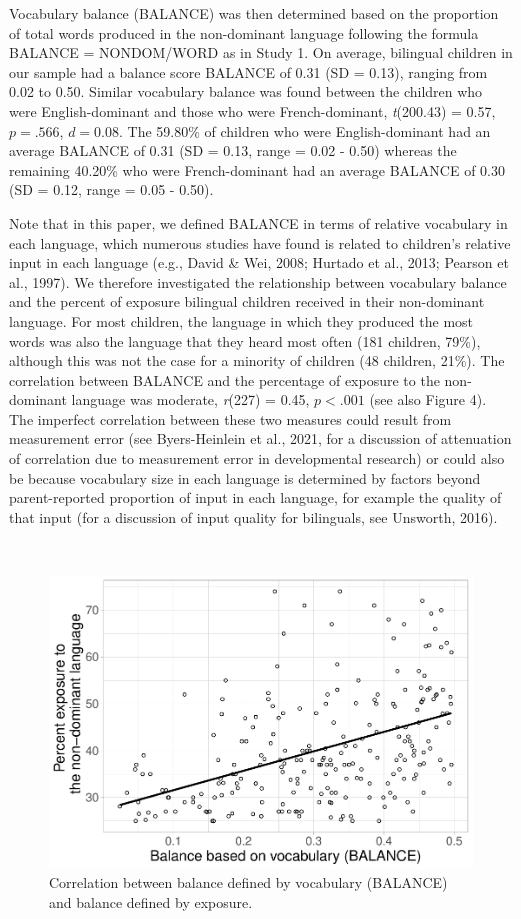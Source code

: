 \documentclass[
  english,
  ,man,floatsintext]{apa6}
\begin{document}
Vocabulary balance (BALANCE) was then determined based on the proportion of total words produced in the non-dominant language following the formula BALANCE = NONDOM/WORD as in Study 1. On average, bilingual children in our sample had a balance score BALANCE of 0.31 (SD = 0.13), ranging from 0.02 to 0.50. Similar vocabulary balance was found between the children who were English-dominant and those who were French-dominant, \emph{t}(200.43) = 0.57, \(p = .566\), \(d = 0.08\). The 59.80\% of children who were English-dominant had an average BALANCE of 0.31 (SD = 0.13, range = 0.02 - 0.50) whereas the remaining 40.20\% who were French-dominant had an average BALANCE of 0.30 (SD = 0.12, range = 0.05 - 0.50).

Note that in this paper, we defined BALANCE in terms of relative vocabulary in each language, which numerous studies have found is related to children's relative input in each language (e.g., David \& Wei, 2008; Hurtado et al., 2013; Pearson et al., 1997). We therefore investigated the relationship between vocabulary balance and the percent of exposure bilingual children received in their non-dominant language. For most children, the language in which they produced the most words was also the language that they heard most often (181 children, 79\%), although this was not the case for a minority of children (48 children, 21\%). The correlation between BALANCE and the percentage of exposure to the non-dominant language was moderate, \emph{r}(227) = 0.45, \(p < .001\) (see also Figure 4). The imperfect correlation between these two measures could result from measurement error (see Byers-Heinlein et al., 2021, for a discussion of attenuation of correlation due to measurement error in developmental research) or could also be because vocabulary size in each language is determined by factors beyond parent-reported proportion of input in each language, for example the quality of that input (for a discussion of input quality for bilinguals, see Unsworth, 2016).

~

\begin{figure}[H]

{\centering \includegraphics[width=0.75\linewidth]{paper_TE_bilingual_vocabulary_model_files/figure-latex/fig4-1} 

}

\caption{Correlation between balance defined by vocabulary (BALANCE) and balance defined by exposure.}\label{fig:fig4}
\end{figure}
\end{document}
